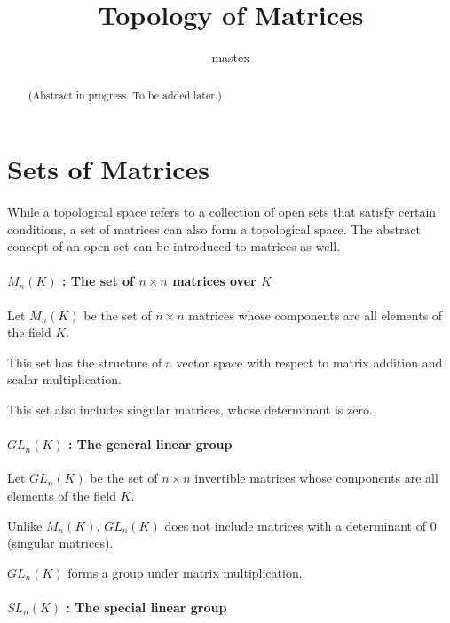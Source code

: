 \documentclass[uplatex,a4j,12pt,dvipdfmx]{jsarticle}
\title{
Topology of Matrices
}
\author{
mastex
}
\begin{document}
\maketitle


\begin{abstract}
	(Abstract in progress. To be added later.)
\end{abstract}

\section{Sets of Matrices}

While a topological space refers to a collection of open sets that satisfy certain conditions, a set of matrices can also form a topological space.
The abstract concept of an open set can be introduced to matrices as well.

\paragraph{$M_{n}(K)$ : The set of $n \times n$ matrices over $K$}

{}

Let $M_{n}(K)$ be the set of $n \times n$ matrices whose components are all elements of the field $K$.

This set has the structure of a vector space with respect to matrix addition and scalar multiplication.

This set also includes singular matrices, whose determinant is zero.

\paragraph{$GL_{n}(K)$ : The general linear group}

{}

Let $GL_{n}(K)$ be the set of $n \times n$ invertible matrices whose components are all elements of the field $K$.

Unlike $M_{n}(K)$, $GL_{n}(K)$ does not include matrices with a determinant of 0 (singular matrices).

$GL_{n}(K)$ forms a group under matrix multiplication.

\paragraph{$SL_{n}(K)$ : The special linear group}

{}
\end{document}
